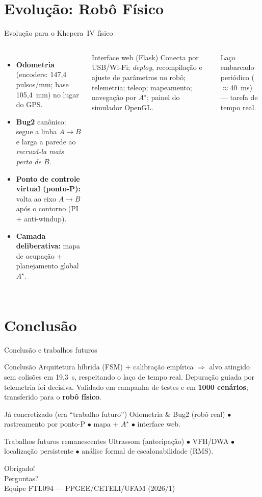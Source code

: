 \documentclass[aspectratio=169,11pt]{beamer}
\begin{document}
\section{Evolução: Robô Físico}
\begin{frame}{Evolução para o Khepera~IV físico}
\begin{columns}[T]
\begin{itemize}\small
  \item \textbf{Odometria} (encoders: 147,4 pulsos/mm; base 105,4~mm) no lugar do GPS.
  \item \textbf{Bug2} canônico: segue a linha $A\!\to\!B$ e larga a parede ao \emph{recruzá-la mais perto de $B$}.
  \item \textbf{Ponto de controle virtual (ponto-P):} volta ao eixo $A\!\to\!B$ após o contorno (PI + anti-windup).
  \item \textbf{Camada deliberativa:} mapa de ocupação + planejamento global \textbf{$A^\star$}.
\end{itemize}
\begin{block}{Interface web (Flask)}
\scriptsize Conecta por USB/Wi-Fi; \emph{deploy}, recompilação e ajuste de parâmetros no robô; telemetria; teleop; mapeamento; navegação por $A^\star$; painel do simulador OpenGL.
\end{block}
\scriptsize Laço embarcado periódico ($\approx$40~ms) --- tarefa de tempo real.
\end{columns}
\end{frame}

\section{Conclusão}
\begin{frame}{Conclusão e trabalhos futuros}
\begin{block}{Conclusão}
Arquitetura híbrida (FSM) + calibração empírica $\Rightarrow$ alvo atingido sem colisões em 19,3~s, respeitando o laço de tempo real. Depuração guiada por telemetria foi decisiva. Validado em campanha de testes e em \textbf{1000 cenários}; transferido para o \textbf{robô físico}.
\end{block}
\begin{block}{Já concretizado (era ``trabalho futuro'')}
Odometria \& Bug2 (robô real) $\bullet$ rastreamento por ponto-P $\bullet$ mapa + $A^\star$ $\bullet$ interface web.
\end{block}
\begin{block}{Trabalhos futuros remanescentes}
Ultrassom (antecipação) $\bullet$ VFH/DWA $\bullet$ localização persistente $\bullet$ análise formal de escalonabilidade (RMS).
\end{block}
\end{frame}

\begin{frame}[plain]
\centering
{\Huge Obrigado!}\\[8pt]
{\large Perguntas?}\\[16pt]
{\footnotesize Equipe FTL094 --- PPGEE/CETELI/UFAM (2026/1)}
\end{frame}
\end{document}
